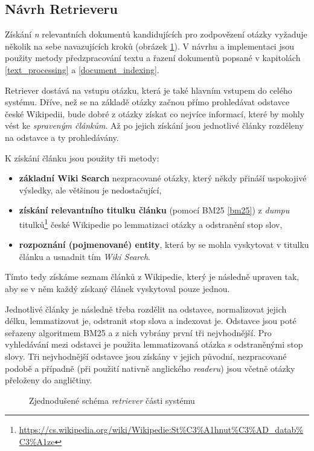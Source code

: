 \subsection{Návrh Retrieveru}
Získání \emph{n} relevantních dokumentů kandidujících pro zodpovězení otázky vyžaduje několik na sebe navazujících kroků (obrázek \ref{retriever-simple-scheme}). V návrhu a implementaci jsou použity metody předzpracování textu a řazení dokumentů popsané v kapitolách \ref{text_processing} a \ref{document_indexing}.\par
Retriever dostává na vstupu otázku, která je také hlavním vstupem do celého systému. Dříve, než se na základě otázky začnou přímo prohledávat odstavce české Wikipedii, bude dobré z otázky získat co nejvíce informací, které by mohly vést ke \emph{spraveným článkům}. Až po jejich získání jsou jednotlivé články rozděleny na odstavce a ty prohledávány.\par
\noindent K získání článku jsou použity tři metody:
\begin{itemize}
    \item \textbf{základní Wiki Search} nezpracované otázky, který někdy přináší uspokojivé výsledky, ale většinou je nedostačující,
    \item \textbf{získání relevantního titulku článku} (pomocí BM25 \ref{bm25}) z \emph{dumpu} titulků\footnote{\url{https://cs.wikipedia.org/wiki/Wikipedie:St\%C3\%A1hnut\%C3\%AD_datab\%C3\%A1ze}} české Wikipedie po lemmatizaci otázky a odstranění stop slov,
    \item \textbf{rozpoznání (pojmenované) entity}, která by se mohla vyskytovat v titulku článku a usnadnit tím \emph{Wiki Search}.
\end{itemize}
Tímto tedy získáme seznam článků z Wikipedie, který je následně upraven tak, aby se v něm každý získaný článek vyskytoval pouze jednou.\par
Jednotlivé články je následně třeba rozdělit na odstavce, normalizovat jejich délku, lemmatizovat je, odstranit stop slova a indexovat je. Odstavce jsou poté seřazeny algoritmem BM25 a z nich vybrány první tři nejvhodnější. Pro vyhledávání mezi odstavci je použita lemmatizovaná otázka s odstraněnými stop slovy. Tři nejvhodnější odstavce jsou získány v jejich původní, nezpracované podobě a případně (při použití nativně anglického \emph{readeru}) jsou včetně otázky přeloženy do angličtiny.

\begin{figure}[hbt]
	\centering
	\caption{Zjednodušené schéma \emph{retriever} části systému}
	\label{retriever-simple-scheme}
\end{figure}

